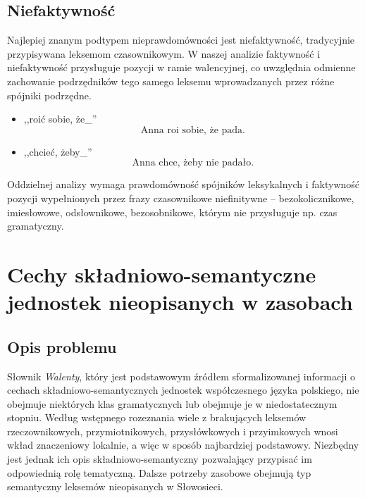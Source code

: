 \documentclass[a4paper, 12pt]{article}
\theoremstyle{remark}
\begin{document}
\subsection{Niefaktywność} %
Najlepiej znanym podtypem nieprawdomówności jest niefaktywność, tradycyjnie przypisywana leksemom czasownikowym. W naszej analizie faktywność i niefaktywność przysługuje pozycji w ramie walencyjnej, co uwzględnia odmienne zachowanie podrzędników tego samego leksemu wprowadzanych przez różne spójniki podrzędne.
\begin{itemize}
	\item ,,roić sobie, że\_''
	\begin{equation}
		\text{Anna roi sobie, że pada.} 
	\end{equation}
	\item ,,chcieć, żeby\_''
	\begin{equation}
		\text{Anna chce, żeby nie padało.} 
	\end{equation}
\end{itemize}

Oddzielnej analizy wymaga prawdomówność spójników leksykalnych i faktywność pozycji wypełnionych przez frazy czasownikowe niefinitywne -- bezokolicznikowe, imiesłowowe, odsłownikowe, bezosobnikowe, którym nie przysługuje np. czas gramatyczny.
	

\section{Cechy składniowo-semantyczne jednostek nieopisanych w zasobach} %
{
\renewcommand\thesection{}
\renewcommand\thesubsection{}
\setcounter{subsection}{-1}
\subsection{Opis problemu} %
\label{sub:opis_problemu}
}
Słownik \emph{Walenty}, który jest podstawowym źródłem sformalizowanej informacji o cechach składniowo-semantycznych jednostek współczesnego języka polskiego, nie obejmuje niektórych klas gramatycznych lub obejmuje je w niedostatecznym stopniu.
Według wstępnego rozeznania wiele z brakujących leksemów rzeczownikowych, przymiotnikowych, przysłówkowych i przyimkowych wnosi wkład znaczeniowy lokalnie, a więc w sposób najbardziej podstawowy. Niezbędny jest jednak ich opis składniowo-semantyczny pozwalający przypisać im odpowiednią rolę tematyczną.
Dalsze potrzeby zasobowe obejmują typ semantyczny leksemów nieopisanych w Słowosieci.
\end{document}
